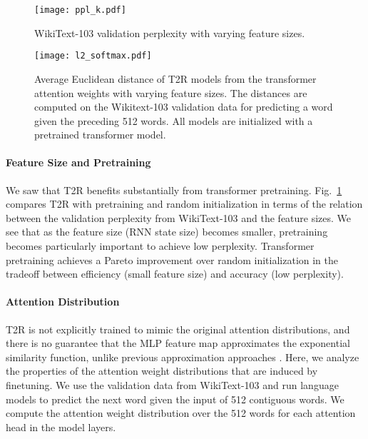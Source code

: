 \documentclass[11pt]{article}
\newcommand{\TRNN}{T2R\xspace}
\begin{document}
\begin{figure}[h]
\centering
    \texttt{[image: ppl\_k.pdf]}
\caption{WikiText-103 validation perplexity with varying feature sizes. }
\label{ppl-k}
\end{figure}
\begin{figure}
\centering
    \texttt{[image: l2\_softmax.pdf]}
\caption{Average Euclidean distance of \TRNN models from the transformer attention weights with varying feature sizes. The distances are computed on the Wikitext-103 validation data for predicting a word given the preceding 512 words.
All models are initialized with a pretrained transformer model.
}
\label{fig:l2-kernel}
\end{figure}














\paragraph{Feature Size and Pretraining}
We saw that \TRNN benefits substantially from transformer pretraining.
Fig.\ \ref{ppl-k} compares \TRNN with pretraining and random initialization in terms of the relation between the validation perplexity from WikiText-103 and the feature sizes.
We see that as the feature size (RNN state size) becomes smaller, pretraining becomes particularly important to achieve low perplexity.
Transformer pretraining achieves a Pareto improvement over random initialization in the tradeoff between efficiency (small feature size) and accuracy (low perplexity).




\paragraph{Attention Distribution}
\label{sec:attn_dist}
\TRNN is not explicitly trained to mimic the original attention distributions, and there is no guarantee that the MLP feature map approximates the exponential similarity function, unlike previous approximation approaches \cite{RFA, performer}.
Here, we analyze the properties of the attention weight distributions that are induced by finetuning.
We use the validation data from WikiText-103 and run language models to predict the next word given the input of 512 contiguous words.
We compute the attention weight distribution over the 512 words for each attention head in the model layers.
\end{document}
